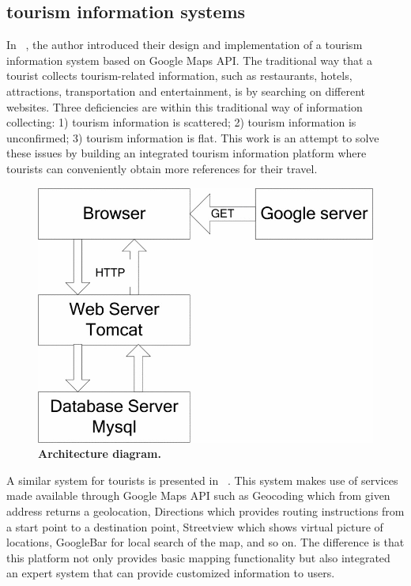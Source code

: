 \documentclass{egpubl}
\begin{document}
\subsection{tourism information systems}
In ~\cite{wu2013design}, the author introduced their design and implementation of a tourism information system based on Google Maps API. The traditional way that a tourist collects tourism-related information, such as restaurants, hotels, attractions, transportation and entertainment, is by searching on different websites. Three deficiencies are within this traditional way of information collecting: 1) tourism information is scattered; 2) tourism information is unconfirmed; 3) tourism information is flat. This work is an attempt to solve these issues by building an integrated tourism information platform where tourists can conveniently obtain more references for their travel.

\begin{figure}[htb]
  \centering
  \includegraphics[width=.95\linewidth]{fig-3-2}
  \caption{\label{fig:fig-3-2} \textbf{Architecture diagram.}}
\end{figure}

A similar system for tourists is presented in ~\cite{pejic2009expert}. This system makes use of services made available through Google Maps API such as Geocoding which from given address returns a geolocation, Directions which provides routing instructions from a start point to a destination point, Streetview which shows virtual picture of locations, GoogleBar for local search of the map, and so on. The difference is that this platform not only provides basic mapping functionality but also integrated an expert system that can provide customized information to users.
\end{document}
